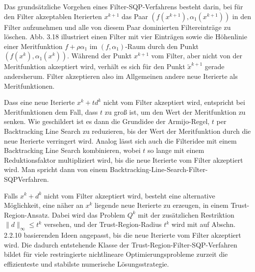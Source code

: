\documentclass[11pt]{scrreprt}
\theoremstyle{thmstyle}
\numberwithin{thm}{section}
\begin{document}
Das grundsätzliche Vorgehen eines Filter-SQP-Verfahrens besteht darin, bei für den Filter akzeptablen Iterierten $x^{k+1}$ das Paar $(f (x^{k+1}), \alpha_1(x^{k+1}))$ in den Filter aufzunehmen und alle von diesem Paar dominierten Filtereinträge zu löschen. Abb. 3.18 illustriert einen Filter mit vier Einträgen sowie die Höhenlinie einer Meritfunktion $f + \rho \alpha_1$ im $(f , \alpha_1)$-Raum durch den Punkt $(f (x^{k}), \alpha_1(x^{k}))$. Während der Punkt $x^{k+1}$ vom Filter, aber nicht von der Meritfunktion akzeptiert wird, verhält es sich für den Punkt $\tilde{x}^{k+1}$ gerade andersherum. Filter akzeptieren also im Allgemeinen andere neue Iterierte als Meritfunktionen. ~\bigskip

Dass eine neue Iterierte $x^k + t d^k$ nicht vom Filter akzeptiert wird, entspricht bei Meritfunktionen dem Fall, dass $t$ zu groß ist, um den Wert der Meritfunktion zu senken. Wie geschildert ist es dann die Grundidee der Armijo-Regel, $t$ per Backtracking Line Search zu reduzieren, bis der Wert der Meritfunktion durch die neue Iterierte verringert wird. Analog lässt sich auch die Filteridee mit einem Backtracking Line Search kombinieren, wobei $t$ so lange mit einem Reduktionsfaktor multipliziert wird, bis die neue Iterierte vom Filter akzeptiert wird. Man spricht dann von einem Backtracking-Line-Search-Filter-SQPVerfahren. ~\bigskip

Falls $x^k + d^k$ nicht vom Filter akzeptiert wird, besteht eine alternative Möglichkeit, eine näher an $x^k$ liegende neue Iterierte zu erzeugen, in einem Trust-Region-Ansatz. Dabei wird das Problem $Q^k$ mit der zusätzlichen Restriktion $\| d\|_{\infty} \leq t^k$ versehen, und der Trust-Region-Radius $t^k$ wird mit auf Abschn. 2.2.10 basierenden Ideen angepasst, bis die neue Iterierte vom Filter akzeptiert wird. Die dadurch entstehende Klasse der Trust-Region-Filter-SQP-Verfahren bildet für viele restringierte nichtlineare Optimierungsprobleme zurzeit die effizienteste und stabilste numerische Lösungsstrategie.
\end{document}
